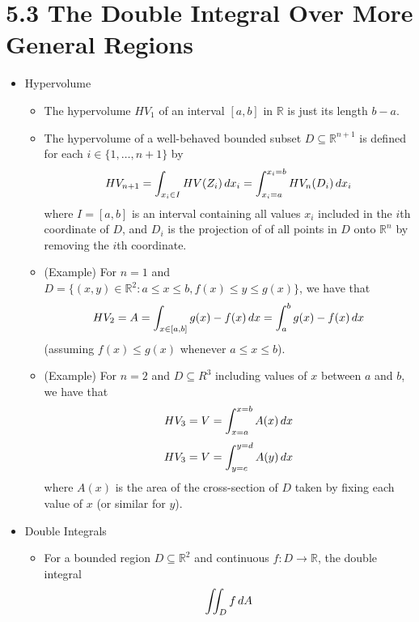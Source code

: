 \documentclass[11pt]{article}
\begin{document}
\section*{5.3 The Double Integral Over More General Regions}
\begin{itemize}
  \item Hypervolume
    \begin{itemize}
      \item The hypervolume \(HV_1\)
      of an interval \([a,b]\) in \(\mathbb R\) is just its length \(b-a\).
      \item The hypervolume of a well-behaved bounded subset
      \(D\subseteq\mathbb R^{n+1}\) is defined for each
      \(i\in\{1,\dots,n+1\}\) by
        \[
          HV_{n+1}
            =
          \int_{x_i\in I}
          HV(Z_i)
          \,d{x_i}
            =
          \int_{x_i=a}^{x_i=b}
          HV_n(D_i)
          \,d{x_i}
        \]
      where \(I=[a,b]\) is an interval containing all values \(x_i\) included
      in the \(i\)th coordinate of \(D\), and \(D_i\) is the projection of
      of all points in \(D\) onto \(\mathbb R^n\) by removing the \(i\)th
      coordinate.
      \item (Example) For \(n=1\) and
      \(D=\{(x,y)\in\mathbb R^2:a\leq x\leq b,f(x)\leq y\leq g(x)\}\), we
      have that
        \[
          HV_2
            =
          A
            =
          \int_{x\in[a,b]}
          g(x)-f(x)
          \,d{x}
            =
          \int_a^b
          g(x)-f(x)
          \,d{x}
        \]
      (assuming \(f(x)\leq g(x)\) whenever \(a\leq x\leq b\)).
      \item (Example) For \(n=2\) and \(D\subseteq R^3\) including values
      of \(x\) between \(a\) and \(b\), we have that
        \[
          HV_3
            =
          V
            =
          \int_{x=a}^{x=b}
          A(x)
          \,d{x}
        \]
        \[
          HV_3
            =
          V
            =
          \int_{y=c}^{y=d}
          A(y)
          \,d{x}
        \]
      where \(A(x)\) is the area of the cross-section of \(D\) taken by fixing
      each value of \(x\) (or similar for \(y\)).
    \end{itemize}
  \item Double Integrals
    \begin{itemize}
      \item
      For a bounded region \(D\subseteq\mathbb R^2\) and continuous
      \(f:D\to\mathbb R\), the double integral
        \[
          \iint_D f\,d A
        \]

\end{itemize}
\end{itemize}
\end{document}
